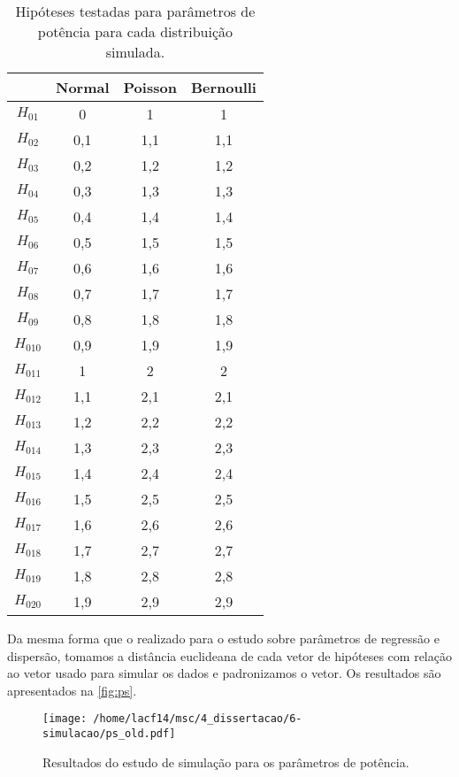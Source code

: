 \begin{table}[H]
\centering
\begin{tabular}{cccc}
\hline
          & Normal & Poisson & Bernoulli \\ \hline
$H_{01}$  & 0      & 1       & 1         \\
$H_{02}$  & 0,1    & 1,1     & 1,1       \\
$H_{03}$  & 0,2    & 1,2     & 1,2       \\
$H_{04}$  & 0,3    & 1,3     & 1,3       \\
$H_{05}$  & 0,4    & 1,4     & 1,4       \\
$H_{06}$  & 0,5    & 1,5     & 1,5       \\
$H_{07}$  & 0,6    & 1,6     & 1,6       \\
$H_{08}$  & 0,7    & 1,7     & 1,7       \\
$H_{09}$  & 0,8    & 1,8     & 1,8       \\
$H_{010}$ & 0,9    & 1,9     & 1,9       \\
$H_{011}$ & 1      & 2       & 2         \\
$H_{012}$ & 1,1    & 2,1     & 2,1       \\
$H_{013}$ & 1,2    & 2,2     & 2,2       \\
$H_{014}$ & 1,3    & 2,3     & 2,3       \\
$H_{015}$ & 1,4    & 2,4     & 2,4       \\
$H_{016}$ & 1,5    & 2,5     & 2,5       \\
$H_{017}$ & 1,6    & 2,6     & 2,6       \\
$H_{018}$ & 1,7    & 2,7     & 2,7       \\
$H_{019}$ & 1,8    & 2,8     & 2,8       \\
$H_{020}$ & 1,9    & 2,9     & 2,9       \\ \hline
\end{tabular}
\caption{Hipóteses testadas para parâmetros de potência para cada distribuição simulada.}
\label{tab:th_p}
\end{table}


Da mesma forma que o realizado para o estudo sobre parâmetros de regressão e dispersão, tomamos a distância euclideana de cada vetor de hipóteses com relação ao vetor usado para simular os dados e padronizamos o vetor. Os resultados são apresentados na \autoref{fig:ps}.

\begin{figure}[H]
\centering
\texttt{[image: /home/lacf14/msc/4\_dissertacao/6-simulacao/ps\_old.pdf]}
\caption{Resultados do estudo de simulação para os parâmetros de potência.}
\label{fig:ps}
\end{figure}


